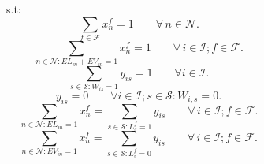 \documentclass[authoryear,preprint,review,12pt]{elsarticle}
\begin{document}
~~~~~~~~~~~~s.t:
\begin{equation}\label{ecua1}
    \sum_{f \in \mathcal{F}} x_n^f = 1 \qquad \forall \,n \in \mathcal{N}.
\end{equation}
\begin{equation}\label{ecua2}
    \sum_{n \in \mathcal{N}: EL_{in} + EV_{in}=1} x_n^f = 1 \qquad \forall \,i \in \mathcal{I}; f \in \mathcal{F}.
\end{equation}
\begin{equation}\label{ecua3}
  \sum_{s \in \mathcal{S}: W_{is}=1} y_{is} = 1 \qquad \forall i \in \mathcal{I}.
\end{equation}
\begin{equation}\label{ecua4}
  y_{is} = 0 \qquad \forall i \in \mathcal{I}; s \in \mathcal{S}: W_{i,s} = 0.
\end{equation}
\begin{equation}\label{ecua5}
  \sum_{n \in \mathcal{N}: EL_{in}=1} x_n^f = \sum_{s \in \mathcal{S}: L_s^f = 1} y_{is} \qquad \forall \,i \in \mathcal{I}; f \in \mathcal{F}.
\end{equation}
\begin{equation}\label{ecua6}
  \sum_{n \in \mathcal{N}: EV_{in}=1} x_n^f = \sum_{s \in \mathcal{S}: L_s^f = 0} y_{is} \qquad \forall \,i \in \mathcal{I}; f \in \mathcal{F}.
\end{equation}
\end{document}
